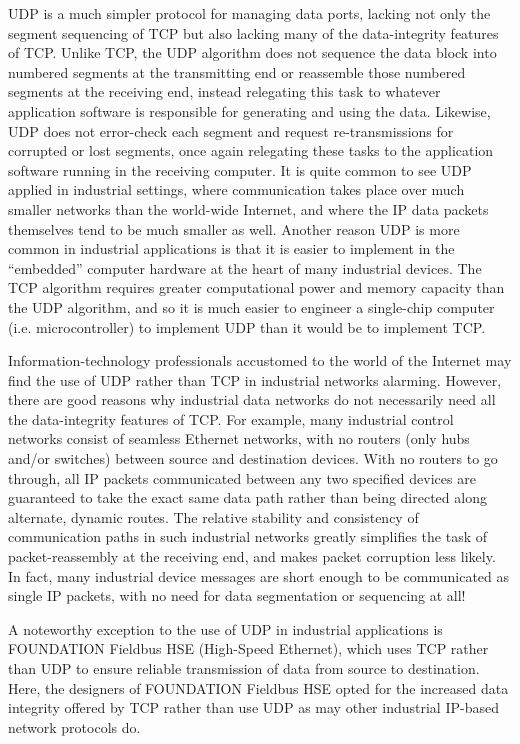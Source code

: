 \vskip 10pt

UDP is a much simpler protocol for managing data ports, lacking not only the segment sequencing of TCP but also lacking many of the data-integrity features of TCP.  Unlike TCP, the UDP algorithm does not sequence the data block into numbered segments at the transmitting end or reassemble those numbered segments at the receiving end, instead relegating this task to whatever application software is responsible for generating and using the data.  Likewise, UDP does not error-check each segment and request re-transmissions for corrupted or lost segments, once again relegating these tasks to the application software running in the receiving computer.  It is quite common to see UDP applied in industrial settings, where communication takes place over much smaller networks than the world-wide Internet, and where the IP data packets themselves tend to be much smaller as well.  Another reason UDP is more common in industrial applications is that it is easier to implement in the ``embedded'' computer hardware at the heart of many industrial devices.  The TCP algorithm requires greater computational power and memory capacity than the UDP algorithm, and so it is much easier to engineer a single-chip computer (i.e. microcontroller) to implement UDP than it would be to implement TCP.    

Information-technology professionals accustomed to the world of the Internet may find the use of UDP rather than TCP in industrial networks alarming.  However, there are good reasons why industrial data networks do not necessarily need all the data-integrity features of TCP.  For example, many industrial control networks consist of seamless Ethernet networks, with no routers (only hubs and/or switches) between source and destination devices.  With no routers to go through, all IP packets communicated between any two specified devices are guaranteed to take the exact same data path rather than being directed along alternate, dynamic routes.  The relative stability and consistency of communication paths in such industrial networks greatly simplifies the task of packet-reassembly at the receiving end, and makes packet corruption less likely.  In fact, many industrial device messages are short enough to be communicated as single IP packets, with no need for data segmentation or sequencing at all!

\vskip 10pt

A noteworthy exception to the use of UDP in industrial applications is FOUNDATION Fieldbus HSE (High-Speed Ethernet), which uses TCP rather than UDP to ensure reliable transmission of data from source to destination.  Here, the designers of FOUNDATION Fieldbus HSE opted for the increased data integrity offered by TCP rather than use UDP as may other industrial IP-based network protocols do.

